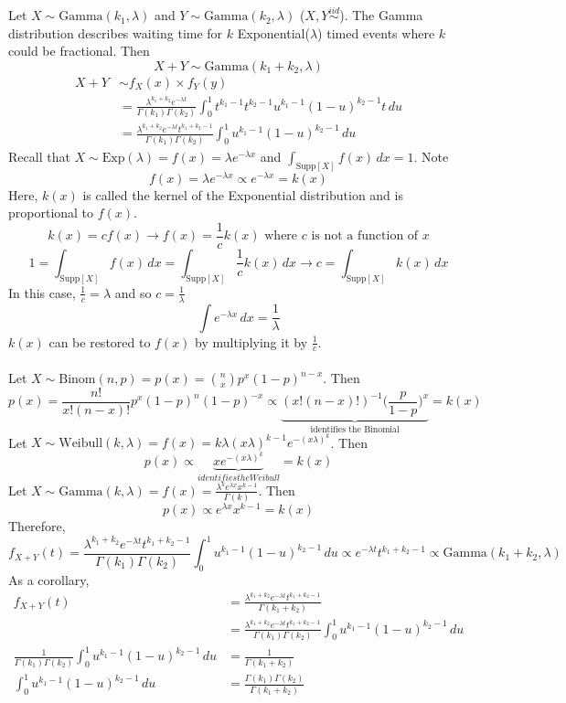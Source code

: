 \documentclass[12pt]{article}
\newcommand{\iid}{\stackrel{iid}{\sim}}
\newcommand{\supp}[1]{\text{Supp}[ #1 ]}
\begin{document}
Let $X \sim \text{Gamma}(k_1, \lambda)$ and $Y \sim \text{Gamma}(k_2,\lambda)$ ($X, Y \iid$). The Gamma distribution describes waiting time for $k$ Exponential($\lambda$) timed events where $k$ could be fractional. Then $$X+Y \sim \text{Gamma}(k_1 + k_2, \lambda)$$ 
$$\begin{aligned} X+Y &\sim f_X(x) \times f_Y(y) \\ &= \frac{\lambda^{k_1 + k_2} e^{-\lambda t}}{\Gamma(k_1)\Gamma(k_2)} \int_0^1 t^{k_1 - 1} t^{k_2 - 1} u^{k_1 -1}(1 - u)^{k_2 - 1}t \, du \\ &= \frac{\lambda^{k_1 + k_2} e^{-\lambda t} t^{k_1 + k_2 - 1}}{\Gamma(k_1)\Gamma(k_2)} \int_0^1 u^{k_1 - 1}(1 - u)^{k_2 - 1} \, du \end{aligned} $$ 
Recall that $X \sim \text{Exp}(\lambda) = f(x) = \lambda e^{-\lambda x}$ and $\int_{\supp{X}} f(x) \, dx = 1$. Note $$f(x) = \lambda e^{-\lambda x} \propto e^{-\lambda x} = k(x) $$ Here, $k(x)$ is called the kernel of the Exponential distribution and is proportional to $f(x)$. $$k(x) = cf(x) \to f(x) = \frac{1}{c}k(x) \text{ where } c \text{ is not a function of } x $$ 
$$1 = \int_{\supp{X}} f(x) \, dx = \int_{\supp{X}} \frac{1}{c} k(x) \, dx \to c = \int_{\supp{X}} k(x) \, dx $$ In this case, $\frac{1}{c} = \lambda$ and so $c = \frac{1}{\lambda}$ $$ \int e^{-\lambda x} \, dx = \frac{1}{\lambda} $$ $k(x)$ can be restored to $f(x)$ by multiplying it by $\frac{1}{c}$. \\~\\
Let $X \sim \text{Binom}(n, p) = p(x) = \binom{n}{x}p^x(1 - p)^{n - x}$. Then 
$$p(x) = \frac{n!}{x!(n - x)!} p^x(1 - p)^n(1 - p)^{-x} \propto \underbrace{(x!(n - x)!)^{-1}\Big(\frac{p}{1 - p}\Big)^x}_{\text{identifies the Binomial}} = k(x)$$ 
Let $X \sim \text{Weibull}(k, \lambda) = f(x) = k\lambda(x\lambda)^{k - 1}e^{-(x\lambda)^k}$. Then 
$$p(x) \propto \underbrace{xe^{-(x\lambda)^k}}_{identifies the Weibull} = k(x) $$ 
Let $X \sim \text{Gamma}(k, \lambda) = f(x) = \frac{\lambda^k e^{\lambda x} x^{k - 1}}{\Gamma(k)}$. Then $$p(x) \propto e^{\lambda x}x^{k - 1} = k(x)$$ Therefore, 
$$ f_{X + Y}(t) = \frac{\lambda^{k_1 + k_2} e^{-\lambda t} t^{k_1 + k_2 - 1}}{\Gamma(k_1)\Gamma(k_2)}\int_0^1 u^{k_1 - 1}(1 - u)^{k_2 - 1} \, du \propto e^{-\lambda t} t^{k_1 + k_2 - 1} \propto \text{Gamma}(k_1 + k_2, \lambda) $$ 
As a corollary, $$\begin{aligned} f_{X + Y}(t) &= \frac{\lambda^{k_1 + k_2} e^{-\lambda t} t^{k_1 + k_2 - 1}}{\Gamma(k_1 + k_2)} \\ &= \frac{\lambda^{k_1 + k_2} e^{-\lambda t} t^{k_1 + k_2 - 1}}{\Gamma(k_1)\Gamma(k_2)} \int_0^1 u^{k_1 - 1}(1 - u)^{k_2 - 1} \, du \\ \frac{1}{\Gamma(k_1)\Gamma(k_2)}\int_0^1 u^{k_1 - 1}(1 - u)^{k_2 - 1} \, du &= \frac{1}{\Gamma(k_1 + k_2)} \\ \int_0^1 u^{k_1 - 1} (1 - u)^{k_2 - 1} \, du &= \frac{\Gamma(k_1)\Gamma(k_2)}{\Gamma(k_1 + k_2)} \end{aligned} $$ 
\end{document}
